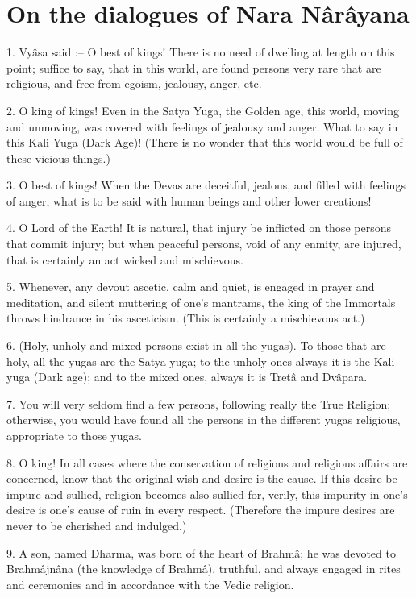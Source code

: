 ﻿\chapter{On the dialogues of Nara N\^ar\^ayana}

1. Vy\^asa said :-- O best of kings! There is no need of dwelling at length on this point; suffice to say, that in this world, are found persons very rare that are religious, and free from egoism, jealousy, anger, etc.

2. O king of kings! Even in the Satya Yuga, the Golden age, this world, moving and unmoving, was covered with feelings of jealousy and anger. What to say in this Kali Yuga (Dark Age)! (There is no wonder that this world would be full of these vicious things.)

3. O best of kings! When the Devas are deceitful, jealous, and filled with feelings of anger, what is to be said with human beings and other lower creations!

4. O Lord of the Earth! It is natural, that injury be inflicted on those persons that commit injury; but when peaceful persons, void of any enmity, are injured, that is certainly an act wicked and mischievous.

5. Whenever, any devout ascetic, calm and quiet, is engaged in prayer and meditation, and silent muttering of one's mantrams, the king of the Immortals throws hindrance in his asceticism. (This is certainly a mischievous act.)

6. (Holy, unholy and mixed persons exist in all the yugas). To those that are holy, all the yugas are the Satya yuga; to the unholy ones always it is the Kali yuga (Dark age); and to the mixed ones, always it is Tret\^a and Dv\^apara.

7. You will very seldom find a few persons, following really the True Religion; otherwise, you would have found all the persons in the different yugas religious, appropriate to those yugas.

8. O king! In all cases where the conservation of religions and religious affairs are concerned, know that the original wish and desire is the cause. If this desire be impure and sullied, religion becomes also sullied for, verily, this impurity in one's desire is one's cause of ruin in every respect. (Therefore the impure desires are never to be cherished and indulged.)

9. A son, named Dharma, was born of the heart of Brahm\^a; he was devoted to Brahm\^ajn\^ana (the knowledge of Brahm\^a), truthful, and always engaged in rites and ceremonies and in accordance with the Vedic religion.

